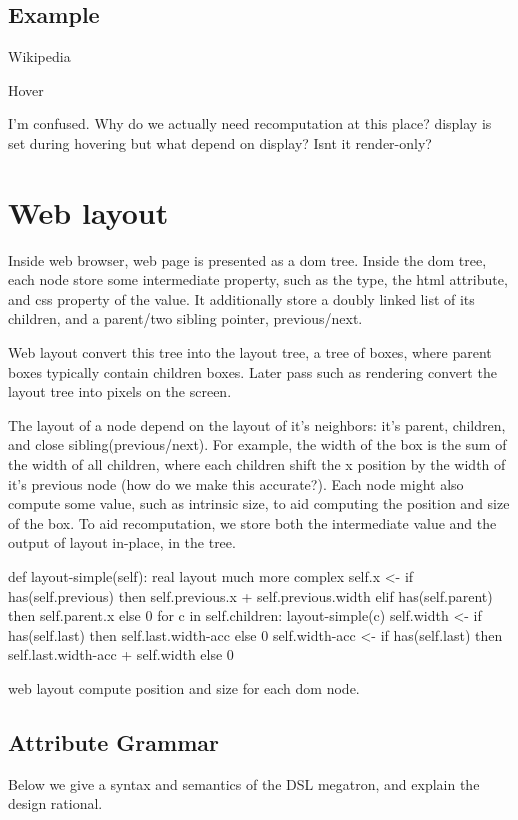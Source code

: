 \documentclass[format=acmsmall, review=false, screen=true]{acmart}
\begin{document}
\subsection{Example}
Wikipedia

Hover

I'm confused. Why do we actually need recomputation at this place? display is set during hovering but what depend on display? Isnt it render-only?

\section{Web layout}
Inside web browser, web page is presented as a dom tree. Inside the dom tree, each node store some intermediate property, such as the type, the html attribute, and css property of the value. It additionally store a doubly linked list of its children, and a parent/two sibling pointer, previous/next. 

Web layout convert this tree into the layout tree, a tree of boxes, where parent boxes typically contain children boxes. Later pass such as rendering convert the layout tree into pixels on the screen.

The layout of a node depend on the layout of it's neighbors: it's parent, children, and close sibling(previous/next). For example, the width of the box is the sum of the width of all children, where each children shift the x position by the width of it's previous node (how do we make this accurate?). Each node might also compute some value, such as intrinsic size, to aid computing the position and size of the box. To aid recomputation, we store both the intermediate value and the output of layout in-place, in the tree.

def layout-simple(self): real layout much more complex
  self.x <- 
    if has(self.previous) then self.previous.x + self.previous.width 
    elif has(self.parent) then self.parent.x else 0
  for c in self.children:
    layout-simple(c)
  self.width <- if has(self.last) then self.last.width-acc else 0
  self.width-acc <- if has(self.last) then self.last.width-acc + self.width else 0

web layout compute position and size for each dom node.

\subsection{Attribute Grammar}
Below we give a syntax and semantics of the DSL megatron, and explain the design rational.
\end{document}
